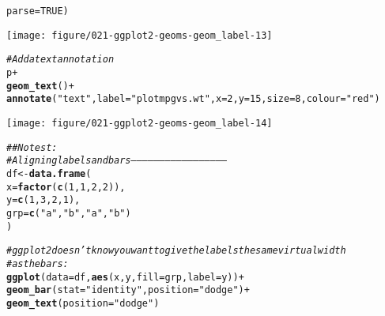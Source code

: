 \documentclass[a4paper,titlepage]{tufte-handout}\usepackage[]{graphicx}\usepackage[]{color}
\makeatletter
\def\maxwidth{ %
  \ifdim\Gin@nat@width>\linewidth
    \linewidth
  \else
    \Gin@nat@width
  \fi
}
\newcommand{\hlnum}[1]{\textcolor[rgb]{0.686,0.059,0.569}{#1}}%
\newcommand{\hlstr}[1]{\textcolor[rgb]{0.192,0.494,0.8}{#1}}%
\newcommand{\hlcom}[1]{\textcolor[rgb]{0.678,0.584,0.686}{\textit{#1}}}%
\newcommand{\hlopt}[1]{\textcolor[rgb]{0,0,0}{#1}}%
\newcommand{\hlstd}[1]{\textcolor[rgb]{0.345,0.345,0.345}{#1}}%
\newcommand{\hlkwb}[1]{\textcolor[rgb]{0.69,0.353,0.396}{#1}}%
\newcommand{\hlkwc}[1]{\textcolor[rgb]{0.333,0.667,0.333}{#1}}%
\newcommand{\hlkwd}[1]{\textcolor[rgb]{0.737,0.353,0.396}{\textbf{#1}}}%
\newenvironment{kframe}{%
 \def\at@end@of@kframe{}%
 \ifinner\ifhmode%
  \def\at@end@of@kframe{\end{minipage}}%
  \begin{minipage}{\columnwidth}%
 \fi\fi%
 \def\FrameCommand##1{\hskip\@totalleftmargin \hskip-\fboxsep
 \colorbox{shadecolor}{##1}\hskip-\fboxsep
     \hskip-\linewidth \hskip-\@totalleftmargin \hskip\columnwidth}%
 \MakeFramed {\advance\hsize-\width
   \@totalleftmargin\z@ \linewidth\hsize
   \@setminipage}}%
 {\par\unskip\endMakeFramed%
 \at@end@of@kframe}
\newenvironment{knitrout}{}{} %
\makeatother
\begin{document}
\begin{knitrout}
\begin{kframe}
\begin{alltt}
  \hlkwc{parse} \hlstd{=} \hlnum{TRUE}\hlstd{)}
\end{alltt}
\end{kframe}
\texttt{[image: figure/021-ggplot2-geoms-geom\_label-13]} 
\begin{kframe}\begin{alltt}
\hlcom{# Add a text annotation}
\hlstd{p} \hlopt{+}
  \hlkwd{geom_text}\hlstd{()} \hlopt{+}
  \hlkwd{annotate}\hlstd{(}\hlstr{"text"}\hlstd{,} \hlkwc{label} \hlstd{=} \hlstr{"plot mpg vs. wt"}\hlstd{,} \hlkwc{x} \hlstd{=} \hlnum{2}\hlstd{,} \hlkwc{y} \hlstd{=} \hlnum{15}\hlstd{,} \hlkwc{size} \hlstd{=} \hlnum{8}\hlstd{,} \hlkwc{colour} \hlstd{=} \hlstr{"red"}\hlstd{)}
\end{alltt}
\end{kframe}
\texttt{[image: figure/021-ggplot2-geoms-geom\_label-14]} 
\begin{kframe}\begin{alltt}
\hlcom{## No test: }
\hlcom{# Aligning labels and bars --------------------------------------------------}
\hlstd{df} \hlkwb{<-} \hlkwd{data.frame}\hlstd{(}
  \hlkwc{x} \hlstd{=} \hlkwd{factor}\hlstd{(}\hlkwd{c}\hlstd{(}\hlnum{1}\hlstd{,} \hlnum{1}\hlstd{,} \hlnum{2}\hlstd{,} \hlnum{2}\hlstd{)),}
  \hlkwc{y} \hlstd{=} \hlkwd{c}\hlstd{(}\hlnum{1}\hlstd{,} \hlnum{3}\hlstd{,} \hlnum{2}\hlstd{,} \hlnum{1}\hlstd{),}
  \hlkwc{grp} \hlstd{=} \hlkwd{c}\hlstd{(}\hlstr{"a"}\hlstd{,} \hlstr{"b"}\hlstd{,} \hlstr{"a"}\hlstd{,} \hlstr{"b"}\hlstd{)}
\hlstd{)}

\hlcom{# ggplot2 doesn't know you want to give the labels the same virtual width}
\hlcom{# as the bars:}
\hlkwd{ggplot}\hlstd{(}\hlkwc{data} \hlstd{= df,} \hlkwd{aes}\hlstd{(x, y,} \hlkwc{fill} \hlstd{= grp,} \hlkwc{label} \hlstd{= y))} \hlopt{+}
  \hlkwd{geom_bar}\hlstd{(}\hlkwc{stat} \hlstd{=} \hlstr{"identity"}\hlstd{,} \hlkwc{position} \hlstd{=} \hlstr{"dodge"}\hlstd{)} \hlopt{+}
  \hlkwd{geom_text}\hlstd{(}\hlkwc{position} \hlstd{=} \hlstr{"dodge"}\hlstd{)}
\end{alltt}



\end{kframe}
\end{knitrout}
\end{document}
